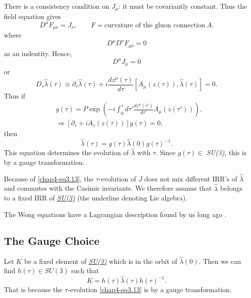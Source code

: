 There is a consistency condition on $J_\mu$: it must be covariantly constant. Thus the field equation gives
\begin{equation}
D^\mu F_{\mu \nu} = J_\nu, \qquad F= \text{curvature of the gluon connection}~ A. \label{chap4-eq3.7}
\end{equation}
where
\begin{equation}
D^\mu D^\nu F_{\mu \nu}=0 \label{chap4-eq3.8}
\end{equation}
as an indentity. Hence,
\begin{equation}
D^\mu J_\mu =0 \label{chap4-eq3.9}
\end{equation}
or
\begin{equation}
D_\tau \hat{\lambda} (\tau) \equiv \partial_\tau \hat{\lambda} (\tau) + i \frac{dz^\mu(\tau)}{d \tau} \left[A_\mu (z(\tau)), \hat{\lambda}(\tau)\right] =0. \label{chap4-eq3.10}
\end{equation}
Thus if
\begin{align}
  & g(\tau) = P \exp \left(-i \int^\tau_0 d \tau' \frac{dz^\mu(\tau')}{d \tau'} A_\mu (z(\tau')) \right), \label{chap4-eq3.11}\\
  & \Longrightarrow [\partial_\tau +i A_\tau (z(\tau))] g (\tau)=0, \label{chap4-eq3.12}
\end{align}
then
\begin{equation}
\hat{\lambda} (\tau) = g (\tau) \hat{\lambda} (0) g (\tau)^{-1}. \label{chap4-eq3.13}
\end{equation}
This equation determines the evolution of $\hat{\lambda}$ with $\tau$. Since $g(\tau) \in$ \textit{SU(3)}, this is by a gauge transformation.

Because of \eqref{chap4-eq3.13}, the $\tau$-evolution of $J$ does not mix different IRR's of $\hat{\lambda}$ and commutes with the Casimir invariants. We therefore assume that $\hat{\lambda}$ belongs to a fixed IRR of \ul{\textit{SU(3)}} (the underline denoting Lie algebra).

The Wong equations have a Lagrangian description found by us long ago \cite{chap4-key12}.

\subsection{The Gauge Choice}\label{chap4-sec3.1}

Let $K$ be a fixed element of \ul{\textit{SU(3)}} which is in the orbit of $\hat{\lambda}(0)$. Then we can find $h (\tau) \in S\!U(3)$ such that
\begin{equation}
  K= h (\tau) \hat{\lambda} (\tau) h(\tau)^{-1}.\label{chap4-eq3.14}
\end{equation}
That is because the $\tau$-evolution \eqref{chap4-eq3.13} is by a gauge transformation.

